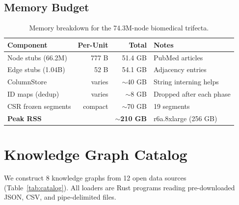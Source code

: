 \documentclass[11pt]{article}
\begin{document}
\subsection{Memory Budget}
\label{sec:memory}

\begin{table}[H]
  \centering
  \caption{Memory breakdown for the 74.3M-node biomedical trifecta.}
  \label{tab:memory}
  \begin{tabular}{@{}lrrl@{}}
    \toprule
    \textbf{Component} & \textbf{Per-Unit} & \textbf{Total} & \textbf{Notes} \\
    \midrule
    Node stubs (66.2M)  & 777 B   & 51.4 GB  & PubMed articles \\
    Edge stubs (1.04B)  & 52 B    & 54.1 GB  & Adjacency entries \\
    ColumnStore         & varies  & ${\sim}$40 GB & String interning helps \\
    ID maps (dedup)     & varies  & ${\sim}$8 GB  & Dropped after each phase \\
    CSR frozen segments & compact & ${\sim}$70 GB & 19 segments \\
    \midrule
    \textbf{Peak RSS}   &         & \textbf{${\sim}$210 GB} & r6a.8xlarge (256 GB) \\
    \bottomrule
  \end{tabular}
\end{table}

\section{Knowledge Graph Catalog}
\label{sec:catalog}

We construct 8 knowledge graphs from 12 open data sources (Table~\ref{tab:catalog}). All loaders are Rust programs reading pre-downloaded JSON, CSV, and pipe-delimited files.
\end{document}
